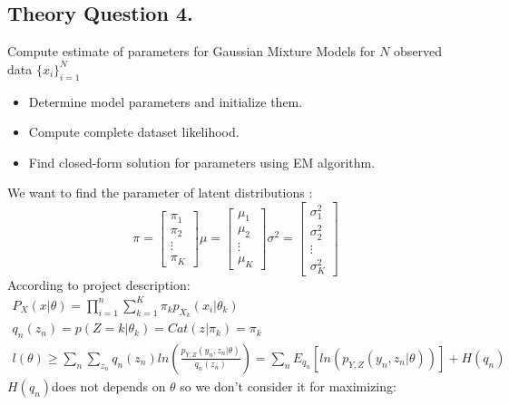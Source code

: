 \documentclass[12pt]{article}
\begin{document}
\subsection{Theory Question 4.}
Compute estimate of parameters for Gaussian Mixture Models for $N$ observed data $\{x_i\}_{i=1}^N$
\begin{itemize}
    \item Determine model parameters and initialize them.
    \item Compute complete dataset likelihood.
    \item Find closed-form solution for parameters using EM algorithm.
\end{itemize}
\begin{qsolve}[solution]
    We want to find the parameter of latent distributions :
    \begin{equation*}
        \pi= \begin{bmatrix}
            \pi_1  \\
            \pi_2  \\
            \vdots \\
            \pi_K
        \end{bmatrix}
        \mu= \begin{bmatrix}
            \mu_1  \\
            \mu_2  \\
            \vdots \\
            \mu_K
        \end{bmatrix}
        \sigma^2= \begin{bmatrix}
            \sigma^2_1 \\
            \sigma^2_2 \\
            \vdots     \\
            \sigma^2_K
        \end{bmatrix}
    \end{equation*}
    According to project description:
    \begin{gather*}
        P_X(x|\theta)  = \prod_{i=1}^n \sum_{k=1}^K \pi_k p_{X_k} (x_i|\theta_k) \\
        q_n(z_n)       = p(Z=k|\theta_k)=Cat(z|\pi_k)=\pi_k                      \\
        l(\theta)\geq\sum_{n}\sum_{z_n}q_n(z_n)ln(\frac{p_{Y,Z}(y_n,z_n|\theta)}{q_n(z_n)})=\sum_{n}E_{q_n}[ln(p_{Y,Z}(y_n,z_n|\theta))]+H(q_n)
    \end{gather*}
    $H(q_n)$does not depends on $\theta$ so we don't consider it for maximizing:

\end{qsolve}
\end{document}
